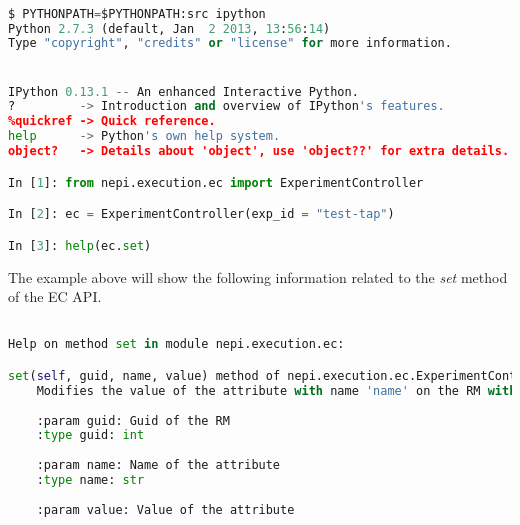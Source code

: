 \begin{lstlisting}[language=Python]

$ PYTHONPATH=$PYTHONPATH:src ipython
Python 2.7.3 (default, Jan  2 2013, 13:56:14) 
Type "copyright", "credits" or "license" for more information.


IPython 0.13.1 -- An enhanced Interactive Python.
?         -> Introduction and overview of IPython's features.
%quickref -> Quick reference.
help      -> Python's own help system.
object?   -> Details about 'object', use 'object??' for extra details.

In [1]: from nepi.execution.ec import ExperimentController

In [2]: ec = ExperimentController(exp_id = "test-tap")

In [3]: help(ec.set)

\end{lstlisting}

The example above will show the following information related to the
\emph{set} method of the EC API.

\begin{lstlisting}[language=Python]

Help on method set in module nepi.execution.ec:

set(self, guid, name, value) method of nepi.execution.ec.ExperimentController instance
    Modifies the value of the attribute with name 'name' on the RM with guid 'guid'.
    
    :param guid: Guid of the RM
    :type guid: int
    
    :param name: Name of the attribute
    :type name: str
    
    :param value: Value of the attribute

\end{lstlisting}


